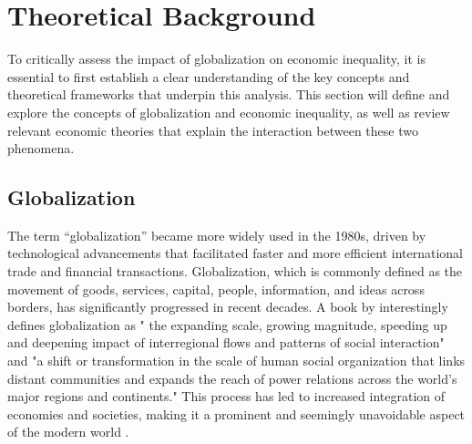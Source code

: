 \chapter{Theoretical Background}\label{chapter:theoreticalBackground}
To critically assess the impact of globalization on economic inequality, it is essential to first establish a clear understanding of the key concepts and theoretical frameworks that underpin this analysis. This section will define and explore the concepts of globalization and economic inequality, as well as review relevant economic theories that explain the interaction between these two phenomena.

\section{Globalization}\label{globalization}

The term “globalization” became more widely used in the 1980s, driven by technological advancements that facilitated faster and more efficient international trade and financial transactions. Globalization, which is commonly defined as the movement of goods, services, capital, people, information, and ideas across borders, has significantly progressed in recent decades. A book by \citep{held2003globalizationDebate} interestingly defines globalization as " the expanding scale, growing magnitude, speeding up and deepening impact of interregional flows and patterns of social interaction" and "a shift or transformation in the scale of human social organization that links distant communities and expands the reach of power relations across the world's major regions and continents." This process has led to increased integration of economies and societies, making it a prominent and seemingly unavoidable aspect of the modern world \citep{agenor2002globalizationPoor}.

